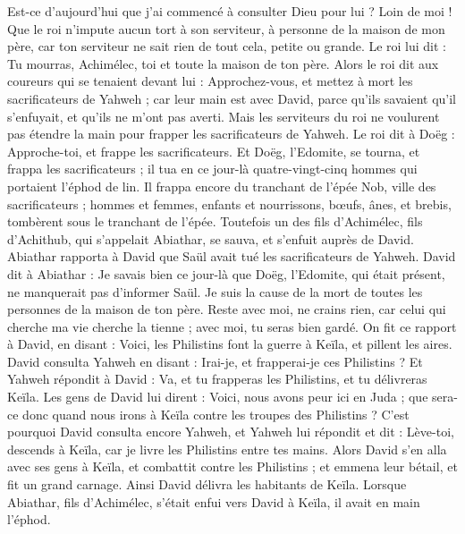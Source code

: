 \begin{multicols}{2}
Est-ce d’aujourd'hui que j’ai commencé à consulter Dieu pour lui ? Loin de moi ! Que le roi n’impute aucun tort à son serviteur, à personne de la maison de mon père, car ton serviteur ne sait rien de tout cela, petite ou grande.
Le roi lui dit : Tu mourras, Achimélec, toi et toute la maison de ton père.
Alors le roi dit aux coureurs qui se tenaient devant lui : Approchez-vous, et mettez à mort les sacrificateurs de Yahweh ; car leur main est avec David, parce qu'ils savaient qu'il s'enfuyait, et qu'ils ne m'ont pas averti. Mais les serviteurs du roi ne voulurent pas étendre la main pour frapper les sacrificateurs de Yahweh.
Le roi dit à Doëg : Approche-toi, et frappe les sacrificateurs. Et Doëg, l’Edomite, se tourna, et frappa les sacrificateurs ; il tua en ce jour-là quatre-vingt-cinq hommes qui portaient l'éphod de lin.
Il frappa encore du tranchant de l’épée Nob, ville des sacrificateurs ; hommes et femmes, enfants et nourrissons, bœufs, ânes, et brebis, tombèrent sous le tranchant de l'épée.
Toutefois un des fils d'Achimélec, fils d'Achithub, qui s’appelait Abiathar, se sauva, et s'enfuit auprès de David.
Abiathar rapporta à David que Saül avait tué les sacrificateurs de Yahweh.
David dit à Abiathar : Je savais bien ce jour-là que Doëg, l’Edomite, qui était présent, ne manquerait pas d’informer Saül. Je suis la cause de la mort de toutes les personnes de la maison de ton père.
Reste avec moi, ne crains rien, car celui qui cherche ma vie cherche la tienne ; avec moi, tu seras bien gardé.
\VerseOne{}On fit ce rapport à David, en disant : Voici, les Philistins font la guerre à Keïla, et pillent les aires.
David consulta Yahweh en disant : Irai-je, et frapperai-je ces Philistins ? Et Yahweh répondit à David : Va, et tu frapperas les Philistins, et tu délivreras Keïla.
Les gens de David lui dirent : Voici, nous avons peur ici en Juda ; que sera-ce donc quand nous irons à Keïla contre les troupes des Philistins ?
C'est pourquoi David consulta encore Yahweh, et Yahweh lui répondit et dit : Lève-toi, descends à Keïla, car je livre les Philistins entre tes mains.
Alors David s'en alla avec ses gens à Keïla, et combattit contre les Philistins ; et emmena leur bétail, et fit un grand carnage. Ainsi David délivra les habitants de Keïla.
Lorsque Abiathar, fils d'Achimélec, s'était enfui vers David à Keïla, il avait en main l'éphod.

\end{multicols}
